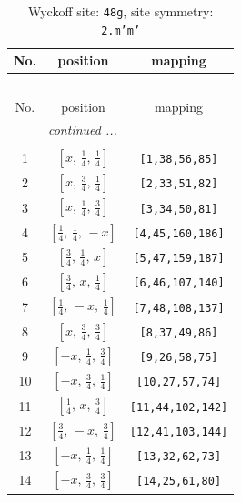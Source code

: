 \documentclass[fleqn,8pt]{jsarticle}
\begin{document}
\begin{longtable}{ccc}
\caption{Wyckoff site: {\tt 48g}, site symmetry: {\tt 2.m'm'}}
 \\
 \hline \hline
No. & position & mapping \\ \hline \endfirsthead

\multicolumn{2}{l}{\tablename\ \thetable{}} \\
 \hline \hline
No. & position & mapping \\ \hline \endhead

 \hline \hline
\multicolumn{2}{r}{\footnotesize\it continued ...} \\ \endfoot

 \hline \hline
\multicolumn{2}{r}{} \\ \endlastfoot

1 & $\left[ x,\, \frac{1}{4},\, \frac{1}{4} \right]$ & {\tt [1,38,56,85]} \\ \hline
2 & $\left[ x,\, \frac{3}{4},\, \frac{1}{4} \right]$ & {\tt [2,33,51,82]} \\ \hline
3 & $\left[ x,\, \frac{1}{4},\, \frac{3}{4} \right]$ & {\tt [3,34,50,81]} \\ \hline
4 & $\left[ \frac{1}{4},\, \frac{1}{4},\, - x \right]$ & {\tt [4,45,160,186]} \\ \hline
5 & $\left[ \frac{3}{4},\, \frac{1}{4},\, x \right]$ & {\tt [5,47,159,187]} \\ \hline
6 & $\left[ \frac{3}{4},\, x,\, \frac{1}{4} \right]$ & {\tt [6,46,107,140]} \\ \hline
7 & $\left[ \frac{1}{4},\, - x,\, \frac{1}{4} \right]$ & {\tt [7,48,108,137]} \\ \hline
8 & $\left[ x,\, \frac{3}{4},\, \frac{3}{4} \right]$ & {\tt [8,37,49,86]} \\ \hline
9 & $\left[ - x,\, \frac{1}{4},\, \frac{3}{4} \right]$ & {\tt [9,26,58,75]} \\ \hline
10 & $\left[ - x,\, \frac{3}{4},\, \frac{1}{4} \right]$ & {\tt [10,27,57,74]} \\ \hline
11 & $\left[ \frac{1}{4},\, x,\, \frac{3}{4} \right]$ & {\tt [11,44,102,142]} \\ \hline
12 & $\left[ \frac{3}{4},\, - x,\, \frac{3}{4} \right]$ & {\tt [12,41,103,144]} \\ \hline
13 & $\left[ - x,\, \frac{1}{4},\, \frac{1}{4} \right]$ & {\tt [13,32,62,73]} \\ \hline
14 & $\left[ - x,\, \frac{3}{4},\, \frac{3}{4} \right]$ & {\tt [14,25,61,80]} \\ \hline

\end{longtable}
\end{document}
